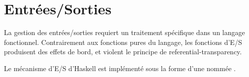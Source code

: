 \part{Entrées/Sorties}

\begin{introduction}
La gestion des entrées/sorties requiert un traitement spécifique dans un langage fonctionnel. Contrairement aux fonctions pures du langage, les fonctions d'E/S produisent des effets de bord, et violent le principe de \gls{referential-transparency}.

Le mécanisme d'E/S d'Haskell est implémenté sous la forme d'une  nommée .
\end{introduction}
